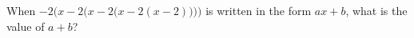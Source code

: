 When $-2\bigl(x-2\bigl(x-2\bigl(x-2(x-2)\bigr)\bigr)\bigr)$ is written in the form $ax+b$, what is the value of $a+b$?
